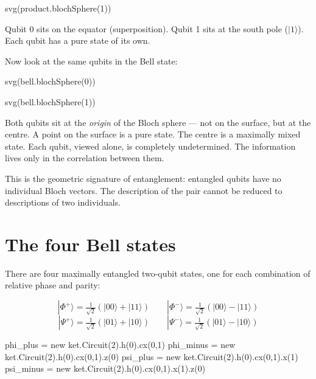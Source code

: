 \documentclass[
  11pt,
  letterpaper,
  oneside]{scrbook}
\newenvironment{Shaded}{\begin{snugshade}}{\end{snugshade}}
\newcommand{\NormalTok}[1]{\textcolor[rgb]{0.00,0.23,0.31}{#1}}
\begin{document}
\begin{Shaded}
\begin{Highlighting}[]
\NormalTok{svg(product.blochSphere(1))}
\end{Highlighting}
\end{Shaded}

Qubit 0 sits on the equator (superposition). Qubit 1 sits at the south
pole (\(|1\rangle\)). Each qubit has a pure state of its own.

Now look at the same qubits in the Bell state:

\begin{Shaded}
\begin{Highlighting}[]
\NormalTok{svg(bell.blochSphere(0))}
\end{Highlighting}
\end{Shaded}

\begin{Shaded}
\begin{Highlighting}[]
\NormalTok{svg(bell.blochSphere(1))}
\end{Highlighting}
\end{Shaded}

Both qubits sit at the \emph{origin} of the Bloch sphere --- not on the
surface, but at the centre. A point on the surface is a pure state. The
centre is a maximally mixed state. Each qubit, viewed alone, is
completely undetermined. The information lives only in the correlation
between them.

This is the geometric signature of entanglement: entangled qubits have
no individual Bloch vectors. The description of the pair cannot be
reduced to descriptions of two individuals.

\section{The four Bell states}\label{the-four-bell-states}

There are four maximally entangled two-qubit states, one for each
combination of relative phase and parity:

\[|\Phi^+\rangle = \tfrac{1}{\sqrt{2}}(|00\rangle + |11\rangle) \qquad |\Phi^-\rangle = \tfrac{1}{\sqrt{2}}(|00\rangle - |11\rangle)\]
\[|\Psi^+\rangle = \tfrac{1}{\sqrt{2}}(|01\rangle + |10\rangle) \qquad |\Psi^-\rangle = \tfrac{1}{\sqrt{2}}(|01\rangle - |10\rangle)\]

\begin{Shaded}
\begin{Highlighting}[]
\NormalTok{phi\_plus  = new ket.Circuit(2).h(0).cx(0,1)}
\NormalTok{phi\_minus = new ket.Circuit(2).h(0).cx(0,1).z(0)}
\NormalTok{psi\_plus  = new ket.Circuit(2).h(0).cx(0,1).x(1)}
\NormalTok{psi\_minus = new ket.Circuit(2).h(0).cx(0,1).x(1).z(0)}
\end{Highlighting}
\end{Shaded}
\end{document}
